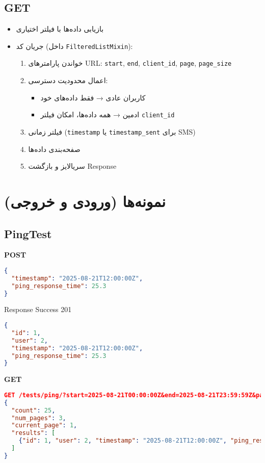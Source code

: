 \documentclass{report}
\begin{document}
\subsection{GET}
\begin{itemize}
    \item بازیابی داده‌ها با فیلتر اختیاری
    \item جریان کد (داخل \texttt{FilteredListMixin}):
    \begin{enumerate}
        \item خواندن پارامترهای URL: \texttt{start}, \texttt{end}, \texttt{client\_id}, \texttt{page}, \texttt{page\_size}
        \item اعمال محدودیت دسترسی:
        \begin{itemize}
            \item کاربران عادی → فقط داده‌های خود
            \item ادمین → همه داده‌ها، امکان فیلتر \texttt{client\_id}
        \end{itemize}
        \item فیلتر زمانی (\texttt{timestamp} یا \texttt{timestamp\_sent} برای SMS)
        \item صفحه‌بندی داده‌ها
        \item سریالایز و بازگشت Response
    \end{enumerate}
\end{itemize}

\section{نمونه‌ها (ورودی و خروجی)}

\subsection{PingTest}
\textbf{POST}
\begin{lstlisting}[language=json]
{
  "timestamp": "2025-08-21T12:00:00Z",
  "ping_response_time": 25.3
}
\end{lstlisting}

Response Success 201
\begin{lstlisting}[language=json]
{
  "id": 1,
  "user": 2,
  "timestamp": "2025-08-21T12:00:00Z",
  "ping_response_time": 25.3
}
\end{lstlisting}

\textbf{GET}
\begin{lstlisting}[language=json]
GET /tests/ping/?start=2025-08-21T00:00:00Z&end=2025-08-21T23:59:59Z&page=1&page_size=10
{
  "count": 25,
  "num_pages": 3,
  "current_page": 1,
  "results": [
    {"id": 1, "user": 2, "timestamp": "2025-08-21T12:00:00Z", "ping_response_time": 25.3}
  ]
}
\end{lstlisting}
\end{document}
